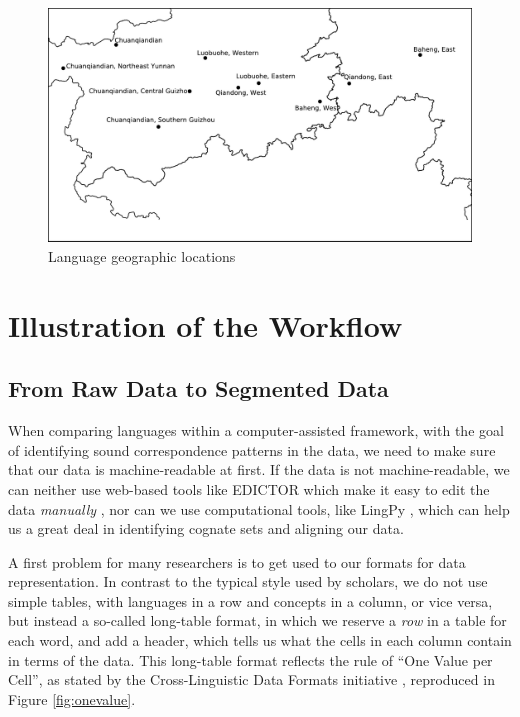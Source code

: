 \documentclass[xetex,svgnames]{scrartcl}
\begin{document}
\begin{figure}[htb]
  \centering
  \includegraphics[width=\textwidth]{Geographic.pdf}
  \caption{Language geographic locations}
  \label{fig:geo}
\end{figure}

\section{Illustration of the Workflow}\label{sec:wf}
\subsection{From Raw Data to Segmented Data}
When comparing languages within a computer-assisted framework, with the goal of identifying sound
correspondence patterns in the data, we need to make sure that our data is machine-readable at
first. If the data is not machine-readable, we can neither use web-based tools like EDICTOR which
make it easy to edit the data \emph{manually} \citep{List2017d}, nor can we use computational tools,
like LingPy \citep{List2018i}, which can help us a great deal in identifying cognate sets and
aligning our data.

A first problem for many researchers is to get used to our formats for data representation. 
In contrast to the typical style used by scholars, we do not use simple tables, with languages in a
row and concepts in a column, or vice versa, but instead a so-called long-table format, in which we
reserve a \emph{row} in a table for each word, and add a header, which tells us what the cells in
each column contain in terms of the data. This long-table format reflects the rule of
``One Value per Cell'', as stated by the Cross-Linguistic Data Formats initiative
\citep{Forkel2018a}, reproduced in Figure \ref{fig:onevalue}. 
\end{document}
